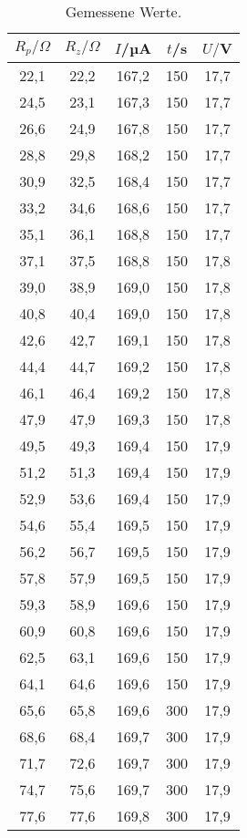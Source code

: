 \begin{table}[htp]
	\begin{center}
    \caption{Gemessene Werte.}
    \label{tab:messwerte}
		\begin{tabular}{ccccc}
    		\toprule
			{$R_p/\Omega$} & {$R_z/\Omega$} & {$I$/µA} & {$t$/s} & {$U/$V}\\
			\midrule
			22,1 & 22,2 & 167,2 & 150 & 17,7\\
			24,5 & 23,1 & 167,3 & 150 & 17,7\\
			26,6 & 24,9 & 167,8 & 150 & 17,7\\
			28,8 & 29,8 & 168,2 & 150 & 17,7\\
			30,9 & 32,5 & 168,4 & 150 & 17,7\\
			33,2 & 34,6 & 168,6 & 150 & 17,7\\
			35,1 & 36,1 & 168,8 & 150 & 17,7\\
			37,1 & 37,5 & 168,8 & 150 & 17,8\\
			39,0 & 38,9 & 169,0 & 150 & 17,8\\
			40,8 & 40,4 & 169,0 & 150 & 17,8\\
			42,6 & 42,7 & 169,1 & 150 & 17,8\\
			44,4 & 44,7 & 169,2 & 150 & 17,8\\
			46,1 & 46,4 & 169,2 & 150 & 17,8\\
			47,9 & 47,9 & 169,3 & 150 & 17,8\\
			49,5 & 49,3 & 169,4 & 150 & 17,9\\
			51,2 & 51,3 & 169,4 & 150 & 17,9\\
			52,9 & 53,6 & 169,4 & 150 & 17,9\\
			54,6 & 55,4 & 169,5 & 150 & 17,9\\
			56,2 & 56,7 & 169,5 & 150 & 17,9\\
			57,8 & 57,9 & 169,5 & 150 & 17,9\\
			59,3 & 58,9 & 169,6 & 150 & 17,9\\
			60,9 & 60,8 & 169,6 & 150 & 17,9\\
			62,5 & 63,1 & 169,6 & 150 & 17,9\\
			64,1 & 64,6 & 169,6 & 150 & 17,9\\
			65,6 & 65,8 & 169,6 & 300 & 17,9\\
			68,6 & 68,4 & 169,7 & 300 & 17,9\\
			71,7 & 72,6 & 169,7 & 300 & 17,9\\
			74,7 & 75,6 & 169,7 & 300 & 17,9\\
			77,6 & 77,6 & 169,8 & 300 & 17,9\\

\end{tabular}
\end{center}
\end{table}
